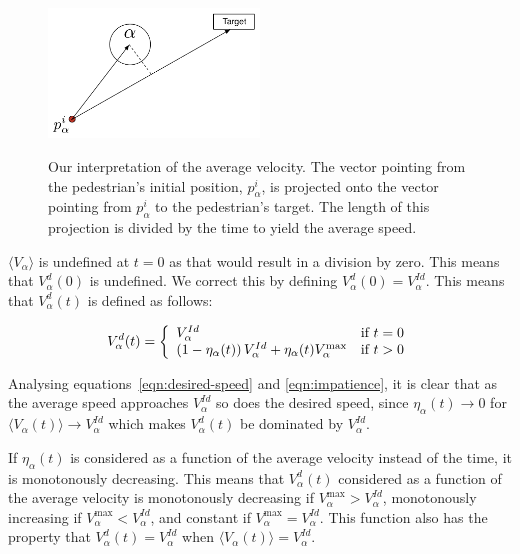 \begin{figure}[ht]
    \centering
    {\includegraphics[width=0.5\textwidth]{Figures/impatience.pdf}} 
    \caption[Our interpretation of the average velocity]{Our interpretation of 
    the average velocity. The vector pointing from the pedestrian's initial 
    position, $p^i_\alpha$, is projected onto the vector pointing from 
    $p^i_\alpha$ to the pedestrian's target. The length of this projection is 
    divided by the time to yield the average speed.}
    \label{impatience}
\end{figure}

$\langle V_{\alpha}\rangle$ is undefined at $t=0$ as that would result in a 
division by zero. This means that $V^d_\alpha(0)$ is undefined. We correct 
this by defining $V^d_\alpha(0)=V^{Id}_\alpha$. This means that $V^d_\alpha(t)$ 
is defined as follows:

\begin{equation}\label{eqn:cond-define}
    V_{\alpha}^{d} (t) = \left\{ 
    \begin{array}{l l}
        V_\alpha^{Id} & \text{if $t=0$}\\
        \left( 1 - \eta_{\alpha}(t) \right) 
        V^{Id}_{\alpha} +
        \eta_{\alpha}(t) V_{\alpha}^{\text{max}}
        & \text{if $t > 0$}\\
    \end{array} \right.
\end{equation}

Analysing equations~\eqref{eqn:desired-speed} and \eqref{eqn:impatience}, it 
is clear that as the average speed approaches $V^{Id}_\alpha$ so does the 
desired speed, since $\eta_\alpha(t)\rightarrow0$ for $\langle V_\alpha(t) 
\rangle \rightarrow V^{Id}_\alpha$ which makes $V^d_\alpha(t)$ be dominated by 
$V^{Id}_\alpha$.  


If $\eta_\alpha(t)$ is considered as a function of the average velocity 
instead of the time, it is monotonously decreasing. This means that 
$V^d_\alpha(t)$ considered as a function of the average velocity is 
monotonously decreasing if $V^{\text{max}}_\alpha > V^{Id}_\alpha$, 
monotonously increasing if $V^{\text{max}}_\alpha < V^{Id}_\alpha$, and 
constant if $V^{\text{max}}_\alpha = V^{Id}_\alpha$. This function also has 
the property that $V^d_\alpha(t)=V^{Id}_\alpha$ when $\langle V_\alpha(t) 
\rangle = V^{Id}_\alpha$.

